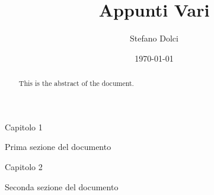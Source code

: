 \documentclass{article}
\begin{document}
\title{Appunti Vari}
\author{Stefano Dolci}
\date{\today}
\maketitle


\begin{abstract}
This is the abstract of the document.
\end{abstract}
\tableofcontents

\begin{section}{Capitolo 1}


    Prima sezione del documento
    
\end{section}
\begin{section}{Capitolo 2}

    Seconda sezione del documento
    
\end{section}
\end{document}

